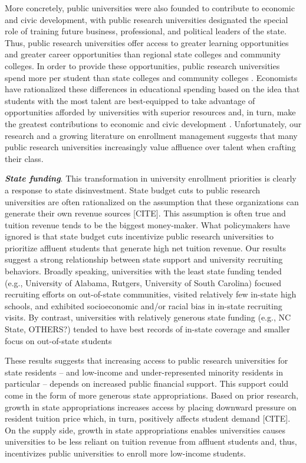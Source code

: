 \documentclass[twoside]{article}
\begin{document}
More concretely, public universities were also founded to contribute to economic and civic development, with public research universities designated the special role of training future business, professional, and political leaders of the state.  Thus, public research universities offer access to greater learning opportunities and greater career opportunities than regional state colleges and community colleges.  In order to provide these opportunities, public research universities spend more per student than state colleges and community colleges \citep{RN1549}. Economists have rationalized these differences in educational spending based on the idea that students with the most talent are best-equipped to take advantage of opportunities afforded by universities with superior resources and, in turn, make the greatest contributions to economic and civic development \citep{RN2247}. Unfortunately, our research and a growing literature on enrollment management suggests that many public research universities increasingly value affluence over talent when crafting their class.

\textbf{\textit{State funding}}. This transformation in university enrollment priorities is clearly a response to state disinvestment.  State budget cuts to public research universities are often rationalized on the assumption that these organizations can generate their own revenue sources [CITE]. This assumption is often true and tuition revenue tends to be the biggest money-maker. What policymakers have ignored is that state budget cuts incentivize public research universities to prioritize affluent students that generate high net tuition revenue.  Our results suggest a strong relationship between state support and university recruiting behaviors.  Broadly speaking, universities with the least state funding tended (e.g., University of Alabama, Rutgers, University of South Carolina) focused recruiting efforts on out-of-state communities, visited relatively few in-state high schools, and exhibited socioeconomic and/or racial bias in in-state recruiting visits.  By contrast, universities with relatively generous state funding (e.g., NC State, OTHERS?) tended to have best records of in-state coverage and smaller focus on out-of-state students

These results suggests that increasing access to public research universities for state residents -- and low-income and under-represented minority residents in particular -- depends on increased public financial support.  This support could come in the form of more generous state appropriations.  Based on prior research, growth in state appropriations increases access by placing downward pressure on resident tuition price which, in turn, positively affects student demand [CITE].  On the supply side, growth in state appropriations enables universities causes universities to be less reliant on tuition revenue from affluent students and, thus, incentivizes public universities to enroll more low-income students.
\end{document}
